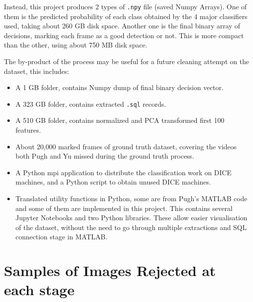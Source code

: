 \documentclass[bsc,frontabs,twoside,fullspacing,parskip,deptreport]{infthesis}
\begin{document}
Instead, this project produces 2 types of {\tt .npy} file (saved Numpy Arrays). 
One of them is the predicted probability of each class obtained by the 4 major classifiers used, taking about 260 GB disk space. 
Another one is the final binary array of decisions, marking each frame as a good detection or not. 
This is more compact than the other, using about 750 MB disk space.

The by-product of the process may be useful for a future cleaning attempt on the dataset, this includes:
\begin{itemize}
\setlength{\parskip}{3pt}
\item A 1 GB folder, contains Numpy dump of final binary decision vector.
\item A 323 GB folder, contains extracted {\tt .sql} records.
\item A 510 GB folder, contains normalized and PCA transformed first 100 features.
\item About 20,000 marked frames of ground truth dataset, covering the videos both Pugh and Yu missed during the ground truth process.
\item A Python mpi application to distribute the classification work on DICE machines, and a Python script to obtain unused DICE machines.
\item Translated utility functions in Python, some are from Pugh's MATLAB code and some of them are implemented in this project. 
This contains several Jupyter Notebooks and two Python libraries. 
These allow easier visualisation of the dataset, without the need to go through multiple extractions and SQL connection stage in MATLAB. 
\end{itemize}

\section{Samples of Images Rejected at each stage}
\end{document}
